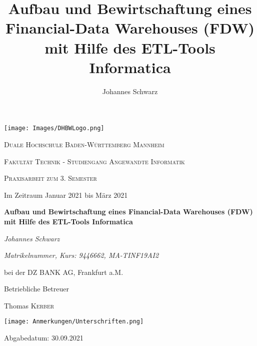 \documentclass[a4paper,12pt]{report}
\title{Aufbau und Bewirtschaftung eines Financial-Data Warehouses (FDW) mit Hilfe des ETL-Tools Informatica}
\author{Johannes Schwarz}
\begin{document}
\begin{titlepage}
	\centering
	\texttt{[image: Images/DHBWLogo.png]}\par\vspace{0.25cm}
	{\scshape\LARGE Duale Hochschule Baden-Württemberg Mannheim \par}
	{\scshape Fakultät Technik - Studiengang Angewandte Informatik\par}
	\vspace{1cm}
	{\scshape\Large Praxisarbeit zum 3. Semester\par}
	{Im Zeitraum Januar 2021 bis März 2021\par}
	\vspace{1cm}
	{\huge\bfseries  Aufbau und Bewirtschaftung eines Financial-Data Warehouses (FDW) mit Hilfe des ETL-Tools Informatica\par}
	\vspace{0.5cm}
	{\Large\itshape Johannes Schwarz\par}
	\vspace{0.25cm}
	{\itshape Matrikelnummer, Kurs: 9446662, MA-TINF19AI2\par}
	\vspace{0.5cm}
	{bei der DZ BANK AG, Frankfurt a.M.\par}
	{Betriebliche Betreuer\par}
	{Thomas \textsc{Kerber}\par}
	{\texttt{[image: Anmerkungen/Unterschriften.png]}\par}

	\vfill

	{\large Abgabedatum: 30.09.2021\par}
\end{titlepage}
\tableofcontents
{}

%












\printbibliography
\end{document}
